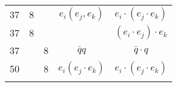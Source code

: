 \documentclass[a4paper,11pt]{article}
\begin{document}
\begin{center}
\begin{tabular}{|c|c|c|c|c|}
    37  &  8 & & $e_{ i } ( e_{ j }, e_{ k } )$
           & $e_{ i } \cdot ( e_{ j } \cdot e_{ k } )$ \\
    37  &  8 & &
           & $( e_{ i } \cdot e_{ j } ) \cdot e_{ k }$ \\
    37  & &  8 & $\bar{q} q$ & $\bar{q} \cdot q$ \\
    50  & &  8 & $e_{ i } ( e_{ j } \cdot e_{ k } )$
           & $e_{ i } \cdot ( e_{ j } \cdot e_{ k } )$ \\
& & & & \\
    \hline
  \end{tabular}






\end{center}
\end{document}
